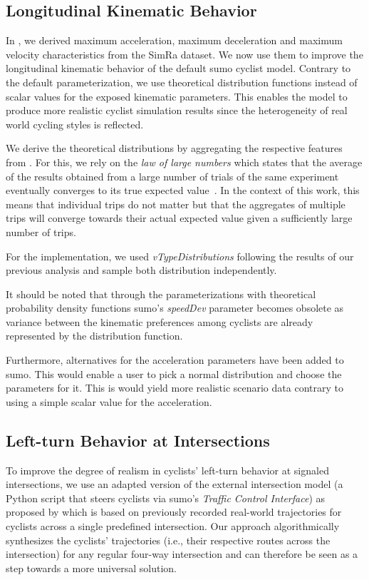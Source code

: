 \subsection{Longitudinal Kinematic Behavior}
\label{subsec:longitudinal_kinematic_behavior}
In , we derived maximum acceleration, maximum deceleration and maximum velocity characteristics from the SimRa dataset.
We now use them to improve the longitudinal kinematic behavior of the default \ac{sumo} cyclist model.
Contrary to the default parameterization, we use theoretical distribution functions instead of scalar values for the exposed kinematic parameters.
This enables the model to produce more realistic cyclist simulation results since the heterogeneity of real world cycling styles is reflected.

We derive the theoretical distributions by aggregating the respective features from .
For this, we rely on the \textit{law of large numbers} which states that the average of the results obtained from a large number of trials of the same experiment eventually converges to its true expected value~\cite{etemadi1981elementary}.
In the context of this work, this means that individual trips do not matter but that the aggregates of multiple trips will converge towards their actual expected value given a sufficiently large number of trips.

For the implementation, we used \textit{vTypeDistributions} following the results of our previous analysis and sample both distribution independently.

It should be noted that through the parameterizations with theoretical probability density functions \ac{sumo}'s \textit{speedDev} parameter becomes obsolete as variance between the kinematic preferences among cyclists are already represented by the distribution function.

Furthermore, alternatives for the acceleration parameters have been added to \ac{sumo}. This would enable a user to pick a normal distribution and choose the parameters for it.
This is would yield more realistic scenario data contrary to using a simple scalar value for the acceleration.

\subsection{Left-turn Behavior at Intersections}
\label{subsec:left-turn_behavior_at_intersections}
To improve the degree of realism in cyclists' left-turn behavior at signaled intersections, we use an adapted version of the external intersection model (a Python script that steers cyclists via \ac{sumo}'s \textit{Traffic Control Interface}) as proposed by \textcite{kaths2016integration} which is based on previously recorded real-world trajectories for cyclists across a single predefined intersection.
Our approach algorithmically synthesizes the cyclists' trajectories (i.e., their respective routes across the intersection) for any regular four-way intersection and can therefore be seen as a step towards a more universal solution.

